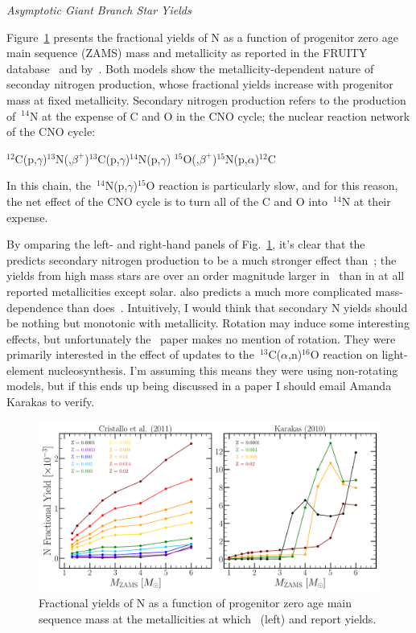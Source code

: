 \documentclass[12pt]{report}
\newcommand\twolineskip{\par\noindent\null\par\noindent}
\begin{document}
\twolineskip 
{\Large \textit{Asymptotic Giant Branch Star Yields}} 
\par\noindent 
Figure~\ref{fig:n_agb_yields} presents the fractional yields of N as a function 
of progenitor zero age main sequence (ZAMS) mass and metallicity as reported in 
the FRUITY database~\citep{Cristallo2011} and by~\citet{Karakas2010}. Both 
models show the metallicity-dependent nature of seconday nitrogen production, 
whose fractional yields increase with progenitor mass at fixed metallicity. 
Secondary nitrogen production refers to the production of~$^{14}$N at the 
expense of C and O in the CNO cycle; the nuclear reaction network of the CNO 
cycle: 

\twolineskip 
$^{12}$C(p,$\gamma$)$^{13}$N(,$\beta^+$)$^{13}$C(p,$\gamma$)$^{14}$N(p,$\gamma$)
$^{15}$O(,$\beta^+$)$^{15}$N(p,$\alpha$)$^{12}$C 

\twolineskip 
In this chain, the~$^{14}$N(p,$\gamma$)$^{15}$O reaction is particularly slow, 
and for this reason, the net effect of the CNO cycle is to turn all of the C 
and O into~$^{14}$N at their expense. 
\par 
By omparing the left- and right-hand panels of Fig.~\ref{fig:n_agb_yields}, 
it's clear that the~\citet{Karakas2010} predicts secondary nitrogen production 
to be a much stronger effect than~\citet{Cristallo2011}; the yields from high 
mass stars are over an order magnitude larger in~\citet{Karakas2010} than in 
\citet{Cristallo2011} at all reported metallicities except solar. 
\citet{Karakas2010} also predicts a much more complicated mass-dependence than 
does~\citet{Cristallo2011}. {\color{red} Intuitively, I would think that 
secondary N yields should be nothing but monotonic with metallicity. Rotation 
may induce some interesting effects, but unfortunately the~\citet{Karakas2010} 
paper makes no mention of rotation. They were primarily interested in the 
effect of updates to the~$^{13}$C($\alpha$,n)$^{16}$O reaction on light-element 
nucleosynthesis. I'm assuming this means they were using non-rotating models, 
but if this ends up being discussed in a paper I should email Amanda Karakas 
to verify. } 

\begin{figure}[!t]
\centering 
\includegraphics[scale = 0.45]{n_agb_yields.pdf} 
\caption{Fractional yields of N as a function of progenitor zero age main 
sequence mass at the metallicities at which~\citet{Cristallo2011} (left) and 
\citet{Karakas2010} report yields.} 
\label{fig:n_agb_yields} 
\end{figure} 


\newpage 
 
  
\end{document}
